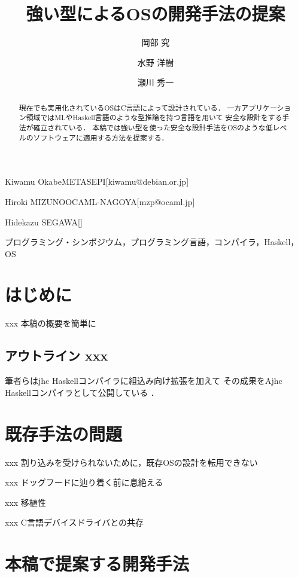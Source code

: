 \documentclass[submit,techreq,noauthor]{ipsj}
\begin{document}
\title{強い型によるOSの開発手法の提案}


\author{岡部 究}{Kiwamu Okabe}{METASEPI}[kiwamu@debian.or.jp]
\author{水野 洋樹}{Hiroki MIZUNO}{OCAML-NAGOYA}[mzp@ocaml.jp]
\author{瀬川 秀一}{Hidekazu SEGAWA}{}[]

\begin{abstract}
現在でも実用化されているOSはC言語によって設計されている．
一方アプリケーション領域ではMLやHaskell言語のような型推論を持つ言語を用いて
安全な設計をする手法が確立されている．
本稿では強い型を使った安全な設計手法をOSのような低レベルのソフトウェアに適用する方法を提案する．
\end{abstract}

\begin{jkeyword}
プログラミング・シンポジウム，プログラミング言語，コンパイラ，Haskell，OS
\end{jkeyword}

\maketitle

\section{はじめに}

xxx 本稿の概要を簡単に

\subsection{アウトライン xxx}

筆者らはjhc Haskellコンパイラに組込み向け拡張を加えて \cite{j-ikamusume5}
その成果をAjhc Haskellコンパイラとして公開している \cite{ajhc} ．

\section{既存手法の問題}

xxx 割り込みを受けられないために，既存OSの設計を転用できない

xxx ドッグフードに辿り着く前に息絶える

xxx 移植性

xxx C言語デバイスドライバとの共存

\section{本稿で提案する開発手法}
\end{document}
